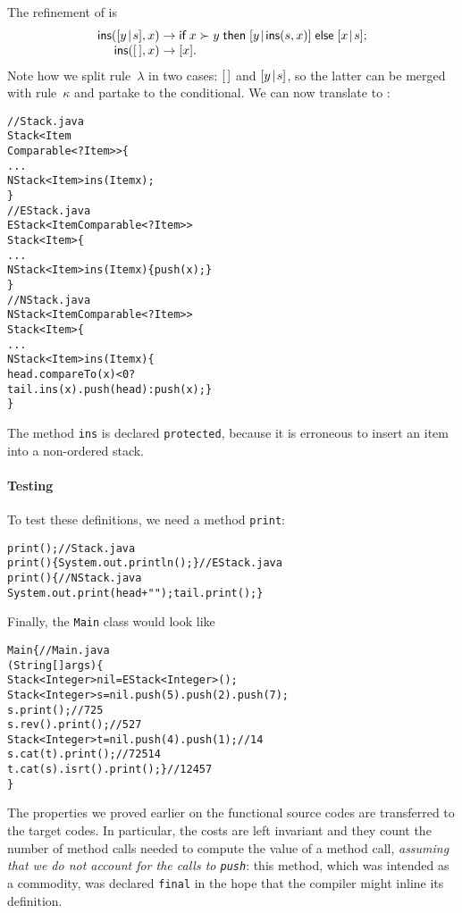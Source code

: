 The refinement of  is
\begin{equation*}
\begin{array}{@{}r@{\;}l@{\;}l@{}}
\fun{ins}(\cons{y}{s},x) & \rightarrow & \fun{if} \; x \succ y \;
\fun{then} \; \cons{y}{\fun{ins}(s,x)} \; \fun{else} \; \cons{x}{s};\\
\fun{ins}(\el,x) & \rightarrow & [x].
\end{array}
\end{equation*}
Note how we split rule~\(\lambda\) in two cases: \([\,]\) and
\([{y}\!\mid\!{s}]\), so the latter can be merged with rule~\(\kappa\) and
partake to the conditional. We can now translate to \Java:
\begin{alltt}
// Stack.java
\public \abstractX \class Stack<Item
\hfill\extends Comparable<? \super Item>> \{
  ...
  \protectedX \abstractX NStack<Item> ins(\final Item x);
\}
// EStack.java
\public \class EStack<Item \extends Comparable<? \super Item>>
       \extends Stack<Item> \{
  ...
  \protectedX NStack<Item> ins(\final Item x) \{\return push(x);\}
\}
// NStack.java
\public \class NStack<Item \extends Comparable<? \super Item>>
       \extends Stack<Item> \{
  ...
  \protectedX NStack<Item> ins(\final Item x) \{
    \return head.compareTo(x) < 0 ?
           tail.ins(x).push(head) : push(x); \}
\}
\end{alltt}
The method \texttt{ins} is declared \texttt{protected}, because it is
erroneous to insert an item into a non\hyp{}ordered stack.

\paragraph{Testing}

To test these definitions, we need a method \texttt{print}:
\begin{alltt}
\public \abstractX \void print();\hfill// Stack.java
\public \void print() \{ System.out.println(); \}\hfill// EStack.java
\public \void print() \{\hfill// NStack.java
  System.out.print(head + " "); tail.print(); \}
\end{alltt}
Finally, the \texttt{Main} class would look like
\begin{alltt}
\public \class Main \{\hfill // Main.java
  \public \static \void \main (String[] args) \{
    Stack<Integer> nil = \new EStack<Integer>();
    Stack<Integer> s = nil.push(5).push(2).push(7);
    s.print();\hfill// 7 2 5
    s.rev().print();\hfill// 5 2 7
    Stack<Integer> t = nil.push(4).push(1);\hfill// 1 4
    s.cat(t).print();\hfill// 7 2 5 1 4
    t.cat(s).isrt().print(); \}\hfill// 1 2 4 5 7
\}
\end{alltt}
The properties we proved earlier on the functional source codes are
transferred to the \Java target codes. In particular, the costs are
left invariant and they count the number of method calls needed to
compute the value of a method call, \emph{assuming that we do not
  account for the calls to \texttt{push}}: this method, which was
intended as a commodity, was declared \texttt{final} in the hope that
the compiler might inline its definition.  

